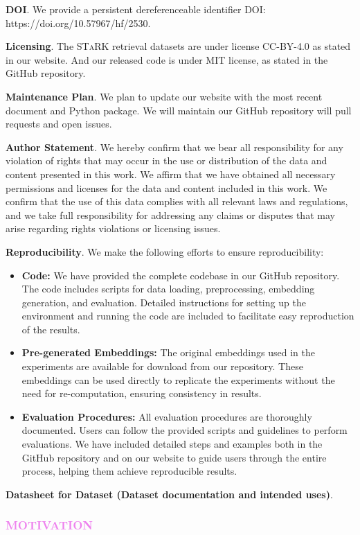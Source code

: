 \documentclass{article}
\newcommand{\benchmarkh}{\textsc{STaRK }}
\newcommand{\xhdr}[1]{{\vspace{-2pt}\noindent\bfseries #1}.}
\newcommand{\sectioncolor}{Violet}
\begin{document}
\xhdr{DOI} We provide a persistent dereferenceable identifier DOI: https://doi.org/10.57967/hf/2530.

\xhdr{Licensing} The \benchmarkh retrieval datasets are under license CC-BY-4.0 as stated in our website. And our released code is under MIT license, as stated in the GitHub repository.

\xhdr{Maintenance Plan} We plan to update our website with the most recent document and Python package. We will maintain our GitHub repository will pull requests and open issues.

\xhdr{Author Statement} We hereby confirm that we bear all responsibility for any violation of rights that may occur in the use or distribution of the data and content presented in this work. We affirm that we have obtained all necessary permissions and licenses for the data and content included in this work. We confirm that the use of this data complies with all relevant laws and regulations, and we take full responsibility for addressing any claims or disputes that may arise regarding rights violations or licensing issues. 

\xhdr{Reproducibility} We make the following efforts to ensure reproducibility:
\begin{itemize}[leftmargin=*]
    \item \textbf{Code:} We have provided the complete codebase in our GitHub repository. The code includes scripts for data loading, preprocessing, embedding generation, and evaluation. Detailed instructions for setting up the environment and running the code are included to facilitate easy reproduction of the results.
    \item \textbf{Pre-generated Embeddings:} The original embeddings used in the experiments are available for download from our repository. These embeddings can be used directly to replicate the experiments without the need for re-computation, ensuring consistency in results.
    \item \textbf{Evaluation Procedures:} All evaluation procedures are thoroughly documented. Users can follow the provided scripts and guidelines to perform evaluations. We have included detailed steps and examples both in the GitHub repository and on our website to guide users through the entire process, helping them achieve reproducible results.
\end{itemize}




\xhdr{Datasheet for Dataset (Dataset documentation and intended uses)} 
\small
\begin{mdframed}[linecolor=\sectioncolor]
\subsubsection*{\textcolor{\sectioncolor}{
    MOTIVATION
}}
\end{mdframed}
\end{document}
